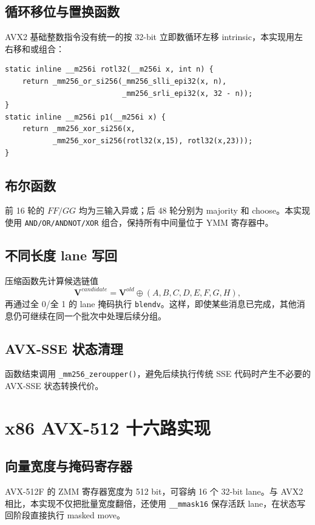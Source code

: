 \documentclass[UTF8,a4paper,12pt]{ctexart}
\newcommand{\code}[1]{\texttt{#1}}
\newcommand{\vect}[1]{\bm{#1}}
\begin{document}
\subsection{循环移位与置换函数}
AVX2 基础整数指令没有统一的按 32-bit 立即数循环左移 intrinsic，本实现用左右移和或组合：
\begin{lstlisting}[style=cstyle,caption={AVX2 循环左移和 $P_1$}]
static inline __m256i rotl32(__m256i x, int n) {
    return _mm256_or_si256(_mm256_slli_epi32(x, n),
                           _mm256_srli_epi32(x, 32 - n));
}
static inline __m256i p1(__m256i x) {
    return _mm256_xor_si256(x,
           _mm256_xor_si256(rotl32(x,15), rotl32(x,23)));
}
\end{lstlisting}

\subsection{布尔函数}
前 16 轮的 $FF/GG$ 均为三输入异或；后 48 轮分别为 majority 和 choose。本实现使用 \code{AND/OR/ANDNOT/XOR} 组合，保持所有中间量位于 YMM 寄存器中。

\subsection{不同长度 lane 写回}
压缩函数先计算候选链值
\begin{equation}
\vect{V}^{candidate}=\vect{V}^{old}\oplus(A,B,C,D,E,F,G,H),
\end{equation}
再通过全 0/全 1 的 lane 掩码执行 \code{blendv}。这样，即使某些消息已完成，其他消息仍可继续在同一个批次中处理后续分组。

\subsection{AVX-SSE 状态清理}
函数结束调用 \code{\_mm256\_zeroupper()}，避免后续执行传统 SSE 代码时产生不必要的 AVX-SSE 状态转换代价。

\section{x86 AVX-512 十六路实现}

\subsection{向量宽度与掩码寄存器}
AVX-512F 的 ZMM 寄存器宽度为 512 bit，可容纳 16 个 32-bit lane。与 AVX2 相比，本实现不仅把批量宽度翻倍，还使用 \code{\_\_mmask16} 保存活跃 lane，在状态写回阶段直接执行 masked move。
\end{document}
